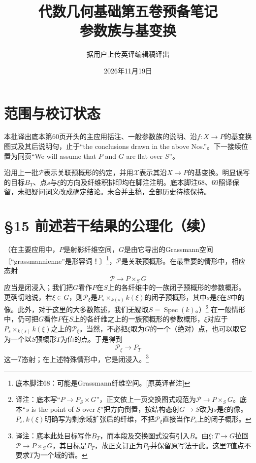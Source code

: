 \documentclass[openany,fontset=fandol]{ctexbook}
\newcommand{\note}[1]{\unskip\nobreak\footnote{译注：#1}}
\begin{document}
\title{代数几何基础第五卷预备笔记\\参数族与基变换}
\author{据用户上传英译编辑稿译出}
\date{2026年11月19日}
\maketitle
\chapter*{范围与校订状态}
本批译出底本第60页开头的主应用括注、一般参数族的说明、沿$f:X\to P$的基变换图式及其后说明句，止于“the conclusions drawn in the above Nos.”。下一接续位置为同页“We will assume that $P$ and $G$ are flat over $S$”。

沿用上一批$\mathcal P$表示关联预概形的约定，并用$\mathcal X$表示其沿$X\to P$的基变换。明显误写的目标$B_T$、点$s$与$\xi$的方向及纤维积排印均在脚注注明。底本脚注68、69照译保留，未把疑问词义改成确定结论。未合并主稿，全部历史待核保持。
\chapter*{§15 前述若干结果的公理化（续）}
（在主要应用中，$P$是射影纤维空间，$G$是由它导出的Grassmann空间〔“grassmannienne”是形容词！〕\footnote{底本脚注68：可能是Grassmann纤维空间。[原英译者注]}，$\mathcal P$是关联预概形。在最重要的情形中，相应态射
\[
\mathcal P\longrightarrow P\times_S G
\]
应当是闭浸入；我们把$G$看作$P$在$S$上的各纤维中的一族闭子预概形的参数概形。更确切地说，若$\xi\in G$，则$\mathcal P_\xi$是$P_s\times_{k(s)}k(\xi)$的闭子预概形，其中$s$是$\xi$在$S$中的像。此外，对于这里的大多数陈述，我们无疑取$S=\operatorname{Spec}(k)$。）\note{底本写“$P\to P_S\times G$”，正文依上一页交换图式规范为$\mathcal P\to P\times_S G$。底本“$s$ is the point of $S$ over $\xi$”把方向倒置，按结构态射$G\to S$改为$s$是$\xi$的像。$P_s,k(\xi)$明确写为剩余域扩张后的纤维，不把$\mathcal P_\xi$直接当作$P_s$上的闭子概形。}
在一般情形中，仍可把$G$看作$P$在$S$上的各纤维之上的一族预概形的参数概形，$\xi$对应于$P_s\times_{k(s)}k(\xi)$之上的$\mathcal P_\xi$。当然，不必把$\xi$取为$G$的一个（绝对）点，也可以取它为一个以$S$预概形$T$为值的点。于是得到
\[
\mathcal P_\xi\longrightarrow P_T
\]
这一$T$态射；在上述特殊情形中，它是闭浸入。\note{底本此处目标写作$B_T$，而本段及交换图式没有引入$B$。由$\xi:T\to G$拉回$\mathcal P\to P\times_S G$，其目标是$P_T$，故正文订正为$P_T$并保留原写法于此。这里$T$值点不要求$T$为一个域的谱。}
\end{document}
